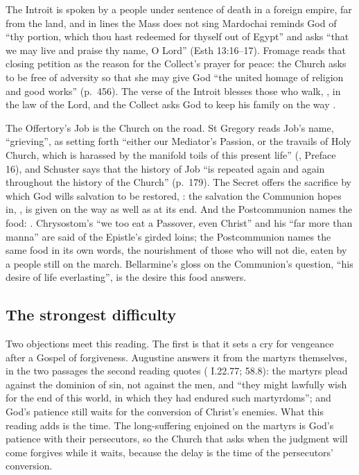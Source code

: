 The Introit is spoken by a people under sentence of death in a foreign empire,
far from the land, and in lines the Mass does not sing Mardochai reminds God of
``thy portion, which thou hast redeemed for thyself out of Egypt'' and asks ``that
we may live and praise thy name, O Lord'' (Esth 13:16--17). Fromage reads that
closing petition as the reason for the Collect's prayer for peace: the Church
asks to be free of adversity so that she may give God ``the united homage of
religion and good works'' (p.~456). The verse of the Introit blesses those who
walk, , in the law of the Lord, and the Collect asks God to
keep his family on the way .

The Offertory's Job is the Church on the road. St Gregory reads Job's name,
``grieving'', as setting forth ``either our Mediator's Passion, or the travails of
Holy Church, which is harassed by the manifold toils of this present life''
(, Preface 16), and Schuster says that the history of Job ``is
repeated again and again throughout the history of the Church'' (p.~179). The
Secret offers the sacrifice by which God wills salvation to be restored,
: the salvation the Communion hopes in, , is given on the way as well as at its end. And the Postcommunion
names the food: . Chrysostom's ``we too eat a
Passover, even Christ'' and his ``far more than manna'' are said of the Epistle's
girded loins; the Postcommunion names the same food in its own words, the
nourishment of those who will not die, eaten by a people still on the march.
Bellarmine's gloss on the Communion's question, ``his desire of life
everlasting'', is the desire this food answers.

\subsection{The strongest difficulty}

Two objections meet this reading. The first is that it sets a cry for vengeance
after a Gospel of forgiveness. Augustine answers it from the martyrs themselves,
in the two passages the second reading quotes (
I.22.77;  58.8): the martyrs plead against the dominion of sin, not
against the men, and ``they might lawfully wish for the end of this world, in
which they had endured such martyrdoms''; and God's patience still waits for the
conversion of Christ's enemies. What this reading adds is the time. The
long-suffering enjoined on the martyrs is God's patience with their persecutors,
so the Church that asks when the judgment will come forgives while it waits,
because the delay is the time of the persecutors' conversion.

